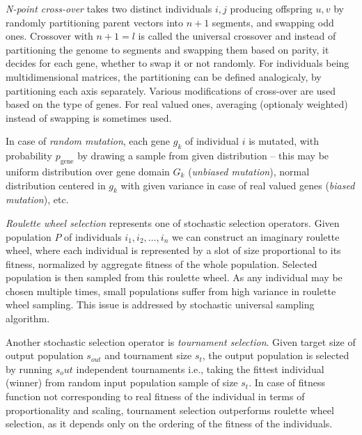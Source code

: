 \emph{N-point cross-over} takes two distinct individuals $i, j$ producing offspring $u, v$ by randomly partitioning parent vectors into $n+1$ segments, and swapping odd ones. Crossover with $n + 1 = l$ is called the universal crossover and instead of partitioning the genome to segments and swapping them based on parity, it decides for each gene, whether to swap it or not randomly. For individuals being multidimensional matrices, the partitioning can be defined analogicaly, by partitioning each axis separately. Various modifications of cross-over are used based on the type of genes. For real valued ones, averaging (optionaly weighted) instead of swapping is sometimes used.

In case of \emph{random mutation}, each gene $g_k$ of individual $i$ is mutated, with probability $p_{\text{gene}}$ by drawing a sample from given distribution -- this may be uniform distribution over gene domain $G_k$ (\emph{unbiased mutation}), normal distribution centered in $g_k$ with given variance in case of real valued genes (\emph{biased mutation}), etc.

\emph{Roulette wheel selection} represents one of stochastic selection operators. Given population $P$ of individuals $i_1, i_2, \dots, i_n$ we can construct an imaginary roulette wheel, where each individual is represented by a slot of size proportional to its fitness, normalized by aggregate fitness of the whole population. Selected population is then sampled from this roulette wheel. As any individual may be chosen multiple times, small populations suffer from high variance in roulette wheel sampling. This issue is addressed by stochastic universal sampling algorithm.

Another stochastic selection operator is \emph{tournament selection}. Given target size of output population $s_{out}$ and tournament size $s_t$, the output population is selected by running $s_out$ independent tournaments i.e., taking the fittest individual (winner) from random input population sample of size $s_t$. In case of fitness function not corresponding to real fitness of the individual in terms of proportionality and scaling, tournament selection outperforms roulette wheel selection, as it depends only on the ordering of the fitness of the individuals.
